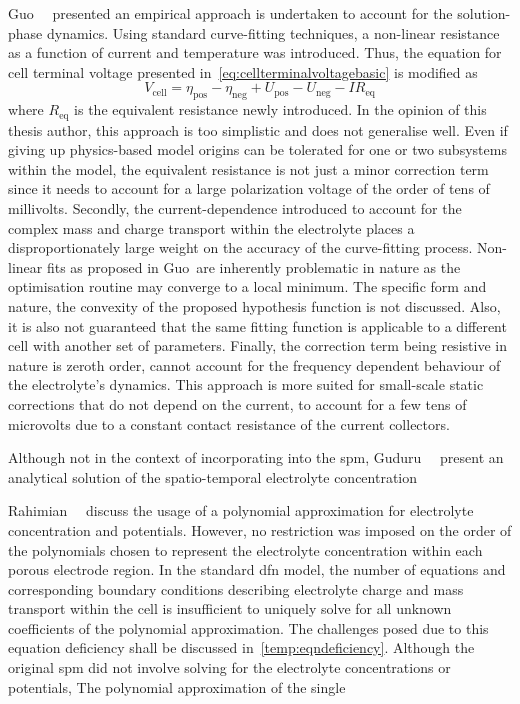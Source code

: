 Guo~\etal~\cite{Guo2011}  presented  an  empirical  approach  is  undertaken  to
account   for  the   solution-phase  dynamics.   Using  standard   curve-fitting
techniques, a  non-linear resistance  as a function  of current  and temperature
was  introduced.  Thus,  the  equation   for  cell  terminal  voltage  presented
in~\cref{eq:cellterminalvoltagebasic} is modified as
\begin{equation}
    V_\text{cell} = η_\text{pos} - η_\text{neg} + U_\text{pos} - U_\text{neg} - I R_\text{eq}
\end{equation}
where  $R_\text{eq}$  is the  equivalent  resistance  newly introduced.  In  the
opinion of  this thesis  author, this  approach is too  simplistic and  does not
generalise well. Even if giving up  physics-based model origins can be tolerated
for one  or two subsystems  within the model,  the equivalent resistance  is not
just a minor correction term since it  needs to account for a large polarization
voltage of  the order  of tens of  millivolts. Secondly,  the current-dependence
introduced  to account  for the  complex mass  and charge  transport within  the
electrolyte  places a  disproportionately large  weight on  the accuracy  of the
curve-fitting process. Non-linear  fits as proposed in  Guo~\etal are inherently
problematic  in nature  as  the optimisation  routine may  converge  to a  local
minimum.  The specific  form and  nature, \eg{}  the convexity  of the  proposed
hypothesis function is  not discussed. Also, it is also  not guaranteed that the
same fitting  function is  applicable to  a different cell  with another  set of
parameters. Finally,  the correction  term being resistive  in nature  is zeroth
order,  \ie{}  cannot account  for  the  frequency  dependent behaviour  of  the
electrolyte's  dynamics. This  approach is  more suited  for small-scale  static
corrections that do not depend on the current,\eg{} to account for a few tens of
microvolts  due to  a constant  contact  resistance of  the current  collectors.

Although not in the context of incorporating into the \gls{spm},
Guduru~\etal~\cite{Guduru2012} present an analytical solution of the
spatio-temporal electrolyte concentration


Rahimian~\etal{}~\cite{KhaleghiRahimian2013} discuss  the usage of  a polynomial
approximation  for   electrolyte  concentration  and  potentials.   However,  no
restriction was imposed on the order  of the polynomials chosen to represent the
electrolyte concentration within  each porous electrode region.  In the standard
\gls{dfn} model, the  number of equations and  corresponding boundary conditions
describing electrolyte charge and mass transport within the cell is insufficient
to uniquely solve for all  unknown coefficients of the polynomial approximation.
The  challenges  posed  due  to  this equation  deficiency  shall  be  discussed
in~\cref{temp:eqndeficiency}. Although  the original  \gls{spm} did  not involve
solving  for  the  electrolyte  concentrations  or  potentials,  The  polynomial
approximation of the single


